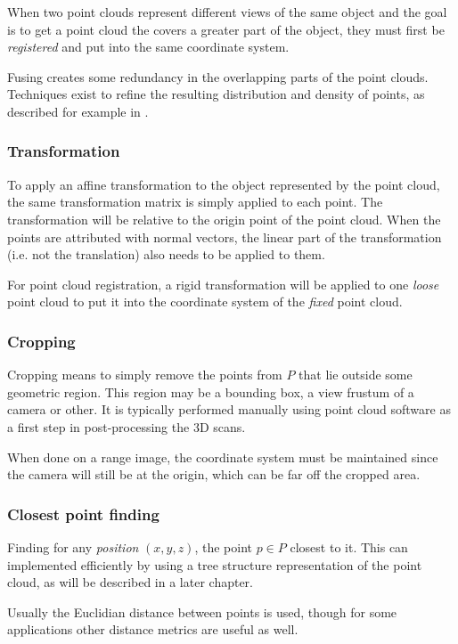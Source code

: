 When two point clouds represent different views of the same object and the goal is to get a point cloud the covers a greater part of the object, they must first be \emph{registered} and put into the same coordinate system.

Fusing creates some redundancy in the overlapping parts of the point clouds. Techniques exist to refine the resulting distribution and density of points, as described for example in \cite{Kyos2013}.


\subsubsection{Transformation}
To apply an affine transformation to the object represented by the point cloud, the same transformation matrix is simply applied to each point. The transformation will be relative to the origin point of the point cloud. When the points are attributed with normal vectors, the linear part of the transformation (i.e. not the translation) also needs to be applied to them.

For point cloud registration, a rigid transformation will be applied to one \emph{loose} point cloud to put it into the coordinate system of the \emph{fixed} point cloud.


\subsubsection{Cropping}
Cropping means to simply remove the points from $P$ that lie outside some geometric region. This region may be a bounding box, a view frustum of a camera or other. It is typically performed manually using point cloud software as a first step in post-processing the 3D scans.

When done on a range image, the coordinate system must be maintained since the camera will still be at the origin, which can be far off the cropped area.


\subsubsection{Closest point finding}
Finding for any \emph{position} $(x, y, z)$, the point $p \in P$ closest to it. This can implemented efficiently by using a tree structure representation of the point cloud, as will be described in a later chapter.

Usually the Euclidian distance between points is used, though for some applications other distance metrics are useful as well.


